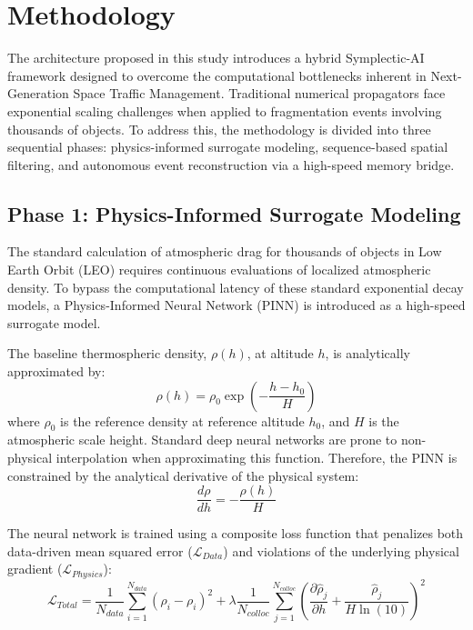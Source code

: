 \documentclass[letterpaper, paper,11pt]{AAS}
\begin{document}
\section{Methodology}
\label{sec:methodology}

The architecture proposed in this study introduces a hybrid Symplectic-AI framework designed to overcome the computational bottlenecks inherent in Next-Generation Space Traffic Management. Traditional numerical propagators face exponential scaling challenges when applied to fragmentation events involving thousands of objects. To address this, the methodology is divided into three sequential phases: physics-informed surrogate modeling, sequence-based spatial filtering, and autonomous event reconstruction via a high-speed memory bridge.

\subsection{Phase 1: Physics-Informed Surrogate Modeling}
\label{subsec:method_phase1}

The standard calculation of atmospheric drag for thousands of objects in Low Earth Orbit (LEO) requires continuous evaluations of localized atmospheric density. To bypass the computational latency of these standard exponential decay models, a Physics-Informed Neural Network (PINN) is introduced as a high-speed surrogate model.

The baseline thermospheric density, $\rho(h)$, at altitude $h$, is analytically approximated by:
$$ \rho(h) = \rho_0 \exp\left(-\frac{h - h_0}{H}\right) $$
where $\rho_0$ is the reference density at reference altitude $h_0$, and $H$ is the atmospheric scale height. Standard deep neural networks are prone to non-physical interpolation when approximating this function. Therefore, the PINN is constrained by the analytical derivative of the physical system:
$$ \frac{d\rho}{dh} = -\frac{\rho(h)}{H} $$

The neural network is trained using a composite loss function that penalizes both data-driven mean squared error ($\mathcal{L}_{Data}$) and violations of the underlying physical gradient ($\mathcal{L}_{Physics}$):
$$ \mathcal{L}_{Total} = \frac{1}{N_{data}} \sum_{i=1}^{N_{data}} (\hat{\rho}_i - \rho_i)^2 + \lambda \frac{1}{N_{colloc}} \sum_{j=1}^{N_{colloc}} \left( \frac{\partial \hat{\rho}_j}{\partial h} + \frac{\hat{\rho}_j}{H \ln(10)} \right)^2 $$
\end{document}
